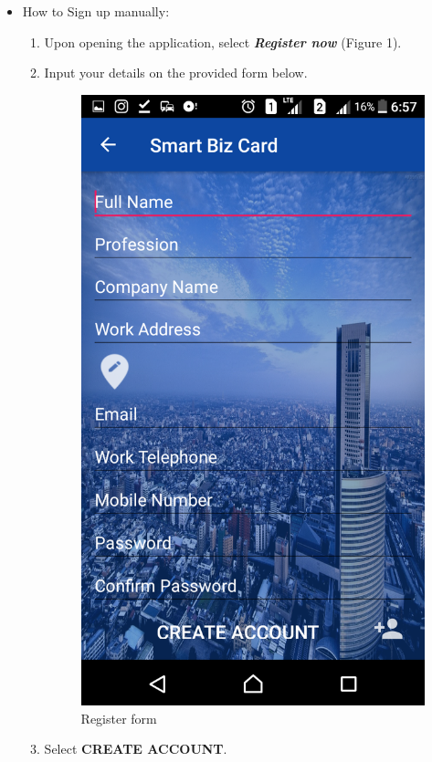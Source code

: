 \documentclass[english]{article}
\begin{document}
	\begin{itemize}	
		\item How to Sign up manually:
		\begin{enumerate}
			\item Upon opening the application, select \textbf{\textit{Register now}} (Figure 1).
			\item Input your details on the provided form below.
			
			
			\begin{figure}[H]
				\centering
				\includegraphics[scale=0.3]{Sign_up.png}
				\caption{Register form}
				\label{figure: 2}
			\end{figure}
		
			\item Select \textbf{CREATE ACCOUNT}.
				
			 

		
		\end{enumerate}
	\end{itemize}
\end{document}
